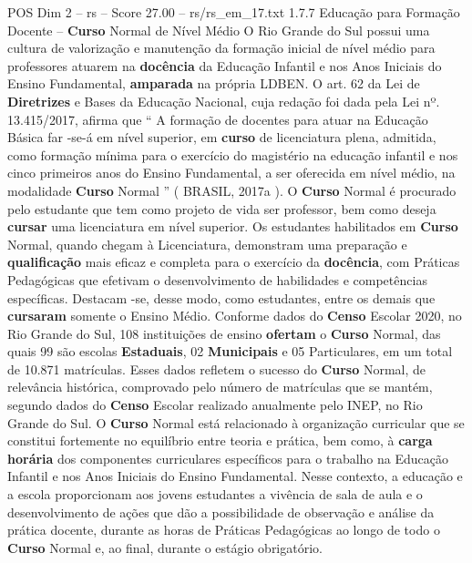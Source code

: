 \begin{textsample}{POS Dim 2 – rs – Score 27.00 – rs/rs\_em\_17.txt}  \label{ex:f2_pos_078}
1.7.7 Educação para Formação Docente – \textbf{Curso} Normal de Nível Médio O Rio Grande do Sul possui uma cultura de valorização e manutenção da formação inicial de nível médio para professores atuarem na \textbf{docência} da Educação Infantil e nos Anos Iniciais do Ensino Fundamental, \textbf{amparada} na própria LDBEN.
O art. 62 da Lei de \textbf{Diretrizes} e Bases da Educação Nacional, cuja redação foi dada pela Lei nº. 13.415/2017, afirma que “ A formação de docentes para atuar na Educação Básica far -se-á em nível superior, em \textbf{curso} de licenciatura plena, admitida, como formação mínima para o exercício do magistério na educação infantil e nos cinco primeiros anos do Ensino Fundamental, a ser oferecida em nível médio, na modalidade \textbf{Curso} Normal ” ( BRASIL, 2017a ).
O \textbf{Curso} Normal é procurado pelo estudante que tem como projeto de vida ser professor, bem como deseja \textbf{cursar} uma licenciatura em nível superior.
Os estudantes habilitados em \textbf{Curso} Normal, quando chegam à Licenciatura, demonstram uma preparação e \textbf{qualificação} mais eficaz e completa para o exercício da \textbf{docência}, com Práticas Pedagógicas que efetivam o desenvolvimento de habilidades e competências específicas.
Destacam -se, desse modo, como estudantes, entre os demais que \textbf{cursaram} somente o Ensino Médio.
Conforme dados do \textbf{Censo} Escolar 2020, no Rio Grande do Sul, 108 instituições de ensino \textbf{ofertam} o \textbf{Curso} Normal, das quais 99 são escolas \textbf{Estaduais}, 02 \textbf{Municipais} e 05 Particulares, em um total de 10.871 matrículas.
Esses dados refletem o sucesso do \textbf{Curso} Normal, de relevância histórica, comprovado pelo número de matrículas que se mantém, segundo dados do \textbf{Censo} Escolar realizado anualmente pelo INEP, no Rio Grande do Sul.
O \textbf{Curso} Normal está relacionado à organização curricular que se constitui fortemente no equilíbrio entre teoria e prática, bem como, à \textbf{carga} \textbf{horária} dos componentes curriculares específicos para o trabalho na Educação Infantil e nos Anos Iniciais do Ensino Fundamental.
Nesse contexto, a educação e a escola proporcionam aos jovens estudantes a vivência de sala de aula e o desenvolvimento de ações que dão a possibilidade de observação e análise da prática docente, durante as horas de Práticas Pedagógicas ao longo de todo o \textbf{Curso} Normal e, ao final, durante o estágio obrigatório.

\end{textsample}
